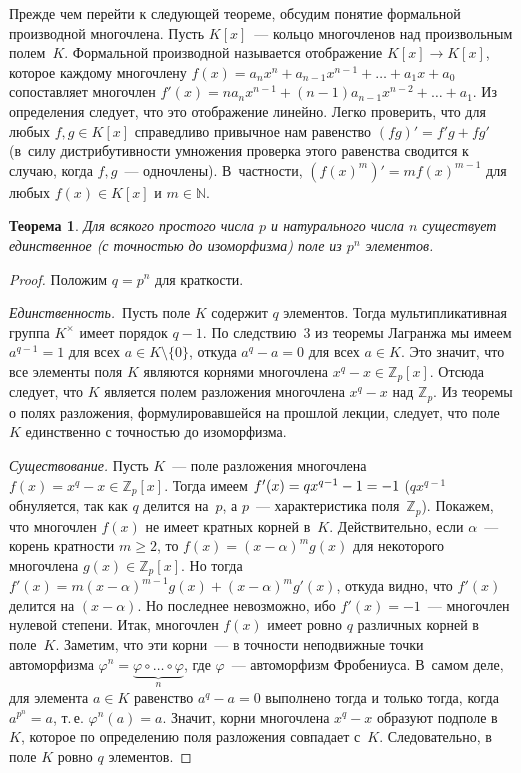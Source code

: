 \documentclass[a4paper,10pt]{amsart}
\def\ZZ{{\mathbb Z}}%
\def\NN{{\mathbb N}}%
\newtheorem{theorem}{Теорема}
\theoremstyle{definition}
\theoremstyle{remark}
\begin{document}
Прежде чем перейти к следующей теореме, обсудим понятие формальной
производной многочлена. Пусть $K[x]$~--- кольцо многочленов над
произвольным полем~$K$. Формальной производной называется
отображение $K[x] \to K[x]$, которое каждому многочлену $f(x) =
a_nx^n + a_{n-1}x^{n-1} + \ldots + a_1 x + a_0$ сопоставляет
многочлен $f'(x) = na_n x^{n-1} + (n-1)a_{n-1}x^{n-2} + \ldots +
a_1$. Из определения следует, что это отображение линейно. Легко
проверить, что для любых $f,g \in K[x]$ справедливо привычное нам
равенство $(fg)' = f'g + fg'$ (в~силу дистрибутивности умножения
проверка этого равенства сводится к случаю, когда $f,g$~---
одночлены). В~частности, $(f(x)^m)' = mf(x)^{m-1}$ для любых $f(x)
\in K[x]$ и $m \in \NN$.

\begin{theorem} \label{thm2}
	Для всякого простого числа $p$ и натурального числа $n$ существует
	единственное \textup(с точностью до изоморфизма\textup) поле из
	$p^n$ элементов.
\end{theorem}

\begin{proof}
	Положим $q = p^n$ для краткости.
	
	{\it Единственность.}\ Пусть поле $K$ содержит $q$ элементов. Тогда
	мультипликативная группа $K^{\times}$ имеет порядок $q-1$. По
	следствию~3 из теоремы Лагранжа мы имеем $a^{q-1}=1$ для всех $a \in
	K \setminus \{0\}$, откуда $a^q - a = 0$ для всех $a\in K$. Это
	значит, что все элементы поля $K$ являются корнями многочлена $x^q -
	x \in \ZZ_p[x]$. Отсюда следует, что $K$ является полем разложения
	многочлена $x^q - x$ над $\ZZ_p$. Из теоремы о полях разложения,
	формулировавшейся на прошлой лекции, следует, что поле $K$
	единственно с точностью до изоморфизма.
	
	\smallskip
	
	{\it Существование.} Пусть $K$~--- поле разложения многочлена $f(x)
	= x^q - x \in \ZZ_p[x]$. Тогда имеем $f'(x)= qx^{q-1} - 1 =\nobreak
	-1$ ($qx^{q-1}$ обнуляется, так как $q$ делится на~$p$, а $p$~---
	характеристика поля~$\ZZ_p$). Покажем, что многочлен $f(x)$ не имеет
	кратных корней в~$K$. Действительно, если $\alpha$~--- корень
	кратности $m \geqslant 2$, то $f(x) = (x - \alpha)^m g(x)$ для
	некоторого многочлена $g(x) \in \ZZ_p[x]$. Но тогда $f'(x) =
	m(x-\alpha)^{m-1} g(x) + (x - \alpha)^m g'(x)$, откуда видно, что
	$f'(x)$ делится на $(x - \alpha)$. Но последнее невозможно, ибо
	$f'(x) = -1$~--- многочлен нулевой степени. Итак, многочлен $f(x)$
	имеет ровно $q$ различных корней в поле~$K$. Заметим, что эти
	корни~--- в точности неподвижные точки автоморфизма $\varphi^n =
	\underbrace{\varphi \circ \ldots \circ \varphi}_n$, где
	$\varphi$~--- автоморфизм Фробениуса. В~самом деле, для элемента $a
	\in K$ равенство $a^q - a = 0$ выполнено тогда и только тогда, когда
	$a^{p^n} = a$, т.\,е. $\varphi^n(a) = a$. Значит, корни многочлена
	$x^q-x$ образуют подполе в~$K$, которое по определению поля
	разложения совпадает с~$K$. Следовательно, в поле $K$ ровно $q$
	элементов.
\end{proof}
\end{document}
